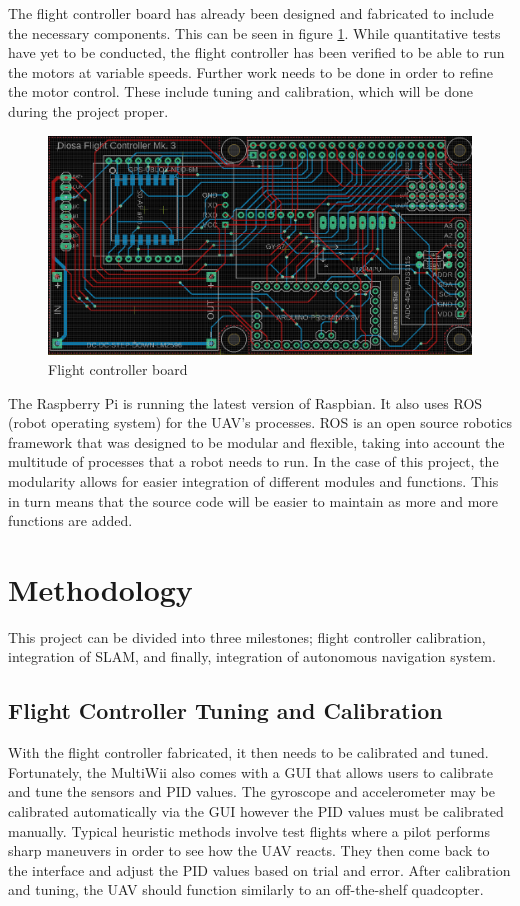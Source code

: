 \documentclass[english]{upeeei}
\begin{document}
\newline
\newline
The flight controller board has already been designed and fabricated to include the necessary components. This can be seen
in figure \ref{fig:fc_board}. While quantitative tests have yet to be conducted, the flight controller has been verified to
be able to run the motors at variable speeds. Further work needs to be done in order to refine the motor control. These include
tuning and calibration, which will be done during the project proper.
\begin{figure}[h]
    \centering
    \includegraphics[scale=0.5]{images/board.PNG}
    \caption{Flight controller board}
    \label{fig:fc_board}
\end{figure} 
\newline
\newline
The Raspberry Pi is running the latest version of Raspbian. It also uses ROS (robot operating system) for
the UAV's processes. ROS is an open source robotics framework that was designed to be modular and flexible, taking into
account the multitude of processes that a robot needs to run. In the case of this project, the modularity allows for
easier integration of different modules and functions. This in turn means that the source code will be easier to maintain
as more and more functions are added.
\chapter{Methodology}
This project can be divided into three milestones; flight controller calibration, integration of SLAM, and
finally, integration of autonomous navigation system.
\section{Flight Controller Tuning and Calibration}
With the flight controller fabricated, it then needs to be calibrated and tuned. Fortunately, the MultiWii also
comes with a GUI that allows users to calibrate and tune the sensors and PID values. The gyroscope and accelerometer may
be calibrated automatically via the GUI however the PID values must be calibrated manually. Typical heuristic methods
involve test flights where a pilot performs sharp maneuvers in order to see how the UAV reacts. They then come back to the
interface and adjust the PID values based on trial and error. After calibration and tuning, the UAV should function 
similarly to an off-the-shelf quadcopter.
\end{document}
